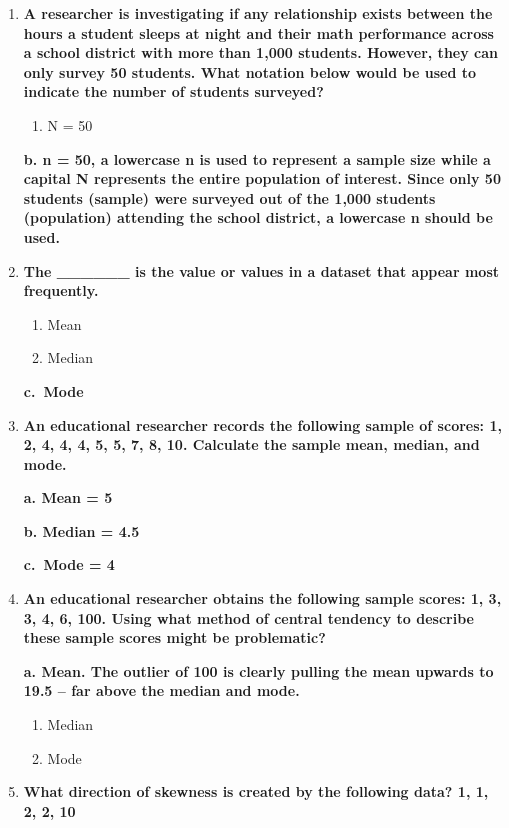 \documentclass[
  letterpaper,
  DIV=11,
  numbers=noendperiod]{scrreprt}
\providecommand{\tightlist}{%
  \setlength{\itemsep}{0pt}\setlength{\parskip}{0pt}}
\begin{document}
\begin{enumerate}
\def\labelenumi{\arabic{enumi}.}
\item
  \textbf{A researcher is investigating if any relationship exists
  between the hours a student sleeps at night and their math performance
  across a school district with more than 1,000 students. However, they
  can only survey 50 students. What notation below would be used to
  indicate the number of students surveyed?}

  \begin{enumerate}
  \def\labelenumii{\alph{enumii}.}
  \tightlist
  \item
    N = 50
  \end{enumerate}

  \textbf{b. n = 50, a lowercase n is used to represent a sample size
  while a capital N represents the entire population of interest. Since
  only 50 students (sample) were surveyed out of the 1,000 students
  (population) attending the school district, a lowercase n should be
  used.}
\item
  \textbf{The \_\_\_\_\_\_ is the value or values in a dataset that
  appear most frequently.}

  \begin{enumerate}
  \def\labelenumii{\alph{enumii}.}
  \item
    Mean
  \item
    Median
  \end{enumerate}

  \textbf{c.~Mode}
\item
  \textbf{An educational researcher records the following sample of
  scores: 1, 2, 4, 4, 4, 5, 5, 7, 8, 10. Calculate the sample mean,
  median, and mode.}

  \textbf{a. Mean = 5}

  \textbf{b. Median = 4.5}

  \textbf{c.~Mode = 4}
\item
  \textbf{An educational researcher obtains the following sample scores:
  1, 3, 3, 4, 6, 100. Using what method of central tendency to describe
  these sample scores might be problematic?}

  \textbf{a. Mean. The outlier of 100 is clearly pulling the mean
  upwards to 19.5 -- far above the median and mode.}

  \begin{enumerate}
  \def\labelenumii{\alph{enumii}.}
  \setcounter{enumii}{1}
  \item
    Median
  \item
    Mode
  \end{enumerate}
\item
  \textbf{What direction of skewness is created by the following data?
  1, 1, 2, 2, 10}


\end{enumerate}
\end{document}

